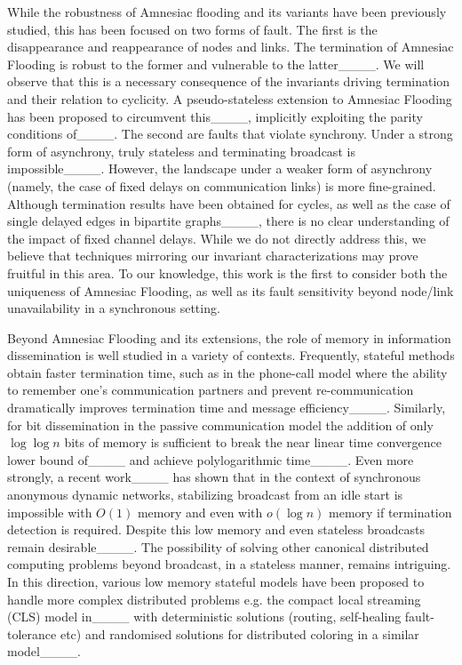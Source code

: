 While the robustness of Amnesiac flooding and its variants have been previously studied, this has been focused on two forms of fault. The first is the disappearance and reappearance of nodes and links. The termination of Amnesiac Flooding is robust to the former and vulnerable to the latter____. We will observe that  this is a necessary consequence of the invariants driving termination and their relation to cyclicity. A pseudo-stateless extension to Amnesiac Flooding has been proposed to circumvent this____, implicitly exploiting the parity conditions of____. The second are faults that violate synchrony. Under a strong form of asynchrony, truly stateless and terminating broadcast is impossible____. However, the landscape under a weaker form of asynchrony (namely, the case of fixed delays on communication links) is more fine-grained. Although termination results have been obtained for cycles, as well as the case of single delayed edges in bipartite graphs____, there is no clear understanding of the impact of fixed channel delays. While we do not directly address this, we believe that techniques mirroring our invariant characterizations may prove fruitful in this area. To our knowledge, this work is the first to consider both the uniqueness of Amnesiac Flooding, as well as its fault sensitivity beyond node/link unavailability in a synchronous setting.

Beyond Amnesiac Flooding and its extensions, the role of memory in information dissemination is well studied in a variety of contexts. Frequently, stateful methods obtain faster termination time, such as in the phone-call model where the ability to remember one's communication partners and prevent re-communication dramatically improves termination time and message efficiency____. 
Similarly, for bit dissemination in the passive communication model the addition of only $\log{\log{n}}$ bits of memory is sufficient to break the near linear time convergence lower bound of____ and achieve polylogarithmic time____. 
Even more strongly, a recent work____ has shown that in the context of synchronous anonymous dynamic networks, stabilizing broadcast from an idle start is impossible with $O(1)$ memory and even with $o(\log{n})$ memory if termination detection is required.
Despite this low memory and even stateless broadcasts remain desirable____. 
The possibility of solving other canonical distributed computing problems beyond broadcast, in a stateless manner, remains intriguing. In this direction, various low memory stateful models have been proposed to handle more complex distributed problems e.g. the compact local streaming (CLS) model in____ with deterministic solutions (routing, self-healing fault-tolerance etc) and randomised solutions for distributed coloring in a similar model____. 

